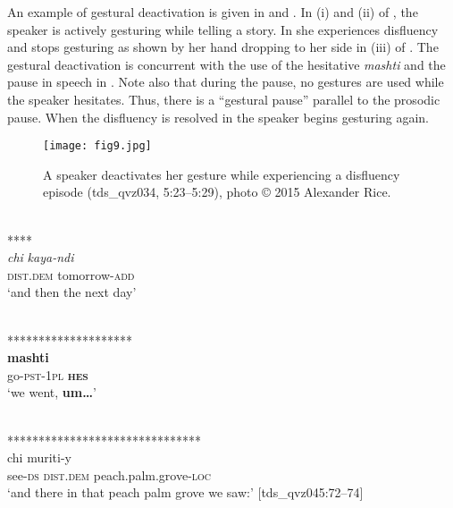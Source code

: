 \documentclass[output=paper]{langscibook}
\begin{document}
An example of gestural deactivation is given in  and . In (i) and (ii) of , the speaker is actively gesturing while telling a story. In  she experiences disfluency and stops gesturing as shown by her hand dropping to her side in (iii) of . The gestural deactivation is concurrent with the use of the hesitative \textit{mashti} and the pause in speech in . Note also that during the pause, no gestures are used while the speaker hesitates. Thus, there is a “gestural pause” parallel to the prosodic pause. When the disfluency is resolved in  the speaker begins gesturing again.

  
\begin{figure}
\texttt{[image: fig9.jpg]}
 \caption{\label{fig:rice:9}A speaker deactivates her gesture while experiencing a disfluency episode (tds\_qvz034, 5:23--5:29), photo © 2015 Alexander Rice.}
\end{figure}

\ea%
\label{ex:rice:30}
\ea \label{ex:rice:30a}
\gllll {} {} \\
{} {{\hspace{7mm}****}}\\
{\textit{chi}} {\textit{kaya-ndi}}\\
{\textsc{dist.dem}} {tomorrow-\textsc{add}}\\
\glt ‘and then the next day’
\medskip

\ex  \label{ex:rice:30b}
 {} \\
\glt *********************\\
 {\textbf{mashti}} {}\\
{go-\textsc{pst-1pl}} {\textbf{\textsc{hes}}} {}\\
\glt ‘we went, \textbf{um…}’
\medskip

\ex      \label{ex:rice:30c}
\gl {} {}\\
\glt ********************************\\
 {chi} {muriti-y}\\
{see-\textsc{ds}} {\textsc{dist.dem}} {peach.palm.grove-\textsc{loc}}\\
\glt ‘and there in that peach palm grove we saw:’ [tds\_qvz045:72--74]
\z
\z
\end{document}
